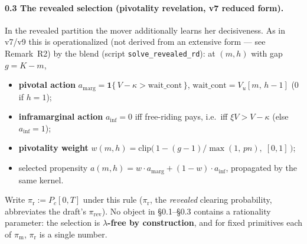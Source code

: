 \paragraph{0.3 The revealed selection (pivotality revelation, v7 reduced form).}
In the revealed partition the mover additionally learns her decisiveness. As in v7/v9 this is operationalized (not derived from an extensive form --- see Remark~R2) by the blend (script \texttt{solve\_revealed\_rd}): at $(m,h)$ with gap $g = K-m$,
\begin{itemize}
\item \textbf{pivotal action} $a_{\mathrm{marg}} = \mathbf{1}\{\, V - \kappa > \mathrm{wait\_cont} \,\}$, $\mathrm{wait\_cont} = V_u[m,\, h-1]$ ($0$ if $h = 1$);
\item \textbf{inframarginal action} $a_{\mathrm{inf}} = 0$ iff free-riding pays, i.e.\ iff $\xi V > V - \kappa$ (else $a_{\mathrm{inf}} = 1$);
\item \textbf{pivotality weight} $w(m,h) = \mathrm{clip}\bigl(\, 1 - (g-1)/\max(1,\, p n),\; [0,1] \,\bigr)$;
\item selected propensity $a(m,h) = w \cdot a_{\mathrm{marg}} + (1-w) \cdot a_{\mathrm{inf}}$, propagated by the same kernel.
\end{itemize}
Write $\pi_{\mathrm{r}} := P_c[0,T]$ under this rule ($\pi_{\mathrm{r}}$, the \emph{revealed} clearing probability, abbreviates the draft's $\pi_{\text{rev}}$). No object in \S 0.1--\S 0.3 contains a rationality parameter: the selection is \textbf{$\lambda$-free by construction}, and for fixed primitives each of $\pi_{\mathrm{m}}$, $\pi_{\mathrm{r}}$ is a single number.

